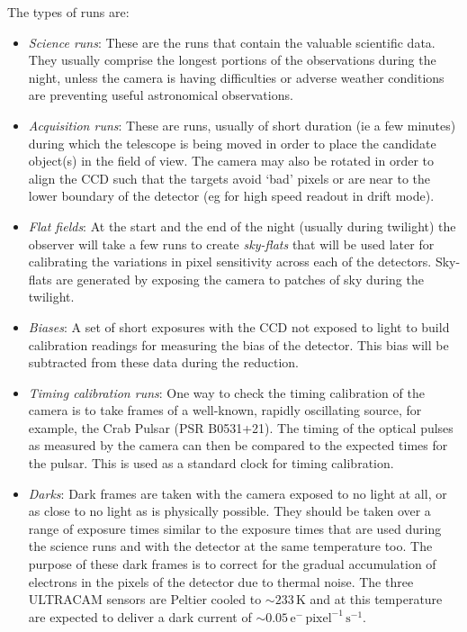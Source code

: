 The types of runs are: 
\begin{itemize}
	\item \emph{Science runs}: These are the runs that contain the valuable scientific data. They usually comprise the longest portions of the observations during the night, unless the camera is having difficulties or adverse weather conditions are preventing useful astronomical observations.
	\item \emph{Acquisition runs}: These are runs, usually of short duration (ie a few minutes) during which the telescope is being moved in order to place the candidate object(s) in the field of view. The camera may also be rotated in order to align the CCD such that the targets avoid `bad' pixels or are near to the lower boundary of the detector (eg for high speed readout in drift mode). 
	\item \emph{Flat fields}: At the start and the end of the night (usually during twilight) the observer will take a few runs to create \emph{sky-flats} that will be used later for calibrating the variations in pixel sensitivity across each of the detectors.  Sky-flats are generated by exposing the camera to patches of sky during the twilight. 
	\item \emph{Biases}: A set of short exposures with the CCD not exposed to light to build calibration readings for measuring the bias of the detector. This bias will be subtracted from these data during the reduction. 
	\item \emph{Timing calibration runs}: One way to check the timing calibration of the camera is to take frames of a well-known, rapidly oscillating source, for example, the Crab Pulsar (PSR B0531+21). The timing of the optical pulses as measured by the camera can then be compared to the expected times for the pulsar. This is used as a standard clock for timing calibration.
	\item \emph{Darks}: Dark frames are taken with the camera exposed to no light at all, or as close to no light as is physically possible. They should be taken over a range of exposure times similar to the exposure times that are used during the science runs and with the detector at the same temperature too. The purpose of these dark frames is to  correct for the gradual accumulation of electrons in the pixels of the detector due to thermal noise. The three ULTRACAM sensors are Peltier cooled to $\sim 233\,\mbox{K}$ and at this temperature are expected to deliver a dark current of $\sim 0.05\,\mbox{e}^{-}\,\mbox{pixel}^{-1}\,\mbox{s}^{-1}$.
\end{itemize}


